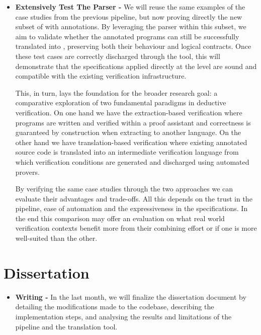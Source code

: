 \begin{itemize}
\item \textbf{Extensively Test The Parser -} We will reuse the same examples of the case studies from the previous pipeline, but now
proving directly the new subset of \cml with \gospel annotations. By leveraging the \gospel parser within this \cml subset, 
we aim to validate whether the annotated programs can still be successfully translated into \ocaml, preserving both their behaviour and 
logical contracts. Once these test cases are correctly discharged through the \cameleer tool, this will demonstrate that the specifications 
applied directly at the \cml level are sound and compatible with the existing verification infrastructure. 

This, in turn, lays the foundation for the broader research goal: a comparative exploration of two fundamental paradigms in deductive 
verification. On one hand we have the extraction-based verification where programs are written and verified within a proof assistant 
and correctness is guaranteed by construction when extracting to another language. On the other hand we have translation-based verification 
where existing annotated source code is translated into an intermediate verification language from which verification conditions are 
generated and discharged using automated provers.

By verifying the same case studies through the two approaches we can evaluate their advantages and trade-offs. All this depends on the 
trust in the pipeline, ease of automation and the expressiveness in the specifications. In the end this comparison may offer an evaluation 
on what real world verification contexts benefit more from their combining effort or if one is more well-suited than the other.


\end{itemize}

\section{Dissertation}

\begin{itemize}

\item \textbf{Writing -}
In the last month, we will finalize the dissertation document by detailing the modifications made to the codebase, describing the 
implementation steps, and analysing the results and limitations of the pipeline and the translation tool.

\end{itemize}


